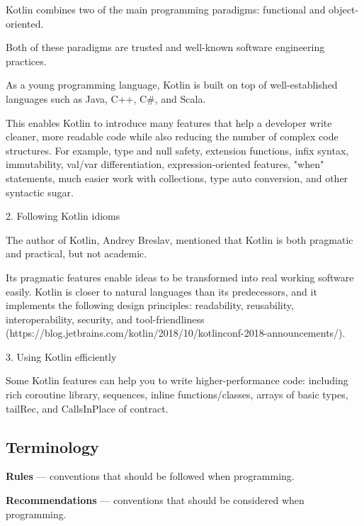     Kotlin combines two of the main programming paradigms: functional and object-oriented.

    Both of these paradigms are trusted and well-known software engineering practices.

    As a young programming language, Kotlin is built on top of well-established languages such as Java, C++, C\#, and Scala.

    This enables Kotlin to introduce many features that help a developer write cleaner, more readable code while also reducing the number of complex code structures. For example, type and null safety, extension functions, infix syntax, immutability, val/var differentiation, expression-oriented features, "when" statements, much easier work with collections, type auto conversion, and other syntactic sugar.



2. Following Kotlin idioms



    The author of Kotlin, Andrey Breslav, mentioned that Kotlin is both pragmatic and practical, but not academic. 

    Its pragmatic features enable ideas to be transformed into real working software easily. Kotlin is closer to natural languages than its predecessors, and it implements the following design principles: readability, reusability, interoperability, security, and tool-friendliness (https://blog.jetbrains.com/kotlin/2018/10/kotlinconf-2018-announcements/).



3. Using Kotlin efficiently



    Some Kotlin features can help you to write higher-performance code: including rich coroutine library, sequences, inline functions/classes, arrays of basic types, tailRec, and CallsInPlace of contract.



\subsection*{\textbf{Terminology}}



\textbf{Rules} — conventions that should be followed when programming.



\textbf{Recommendations} — conventions that should be considered when programming.



